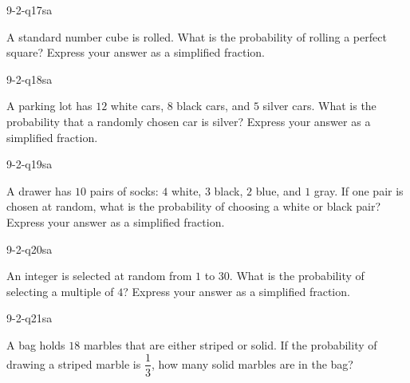 \begin{practiceQuestion}{9-2-q17}{sa}
\begin{questionText}
A standard number cube is rolled. What is the probability of rolling a perfect square? Express your answer as a simplified fraction.
\end{questionText}
\end{practiceQuestion}

\begin{practiceQuestion}{9-2-q18}{sa}
\begin{questionText}
A parking lot has $12$ white cars, $8$ black cars, and $5$ silver cars. What is the probability that a randomly chosen car is silver? Express your answer as a simplified fraction.
\end{questionText}
\end{practiceQuestion}

\begin{practiceQuestion}{9-2-q19}{sa}
\begin{questionText}
A drawer has $10$ pairs of socks: $4$ white, $3$ black, $2$ blue, and $1$ gray. If one pair is chosen at random, what is the probability of choosing a white or black pair? Express your answer as a simplified fraction.
\end{questionText}
\end{practiceQuestion}

\begin{practiceQuestion}{9-2-q20}{sa}
\begin{questionText}
An integer is selected at random from $1$ to $30$. What is the probability of selecting a multiple of $4$? Express your answer as a simplified fraction.
\end{questionText}
\end{practiceQuestion}

\begin{practiceQuestion}{9-2-q21}{sa}
\begin{questionText}
A bag holds $18$ marbles that are either striped or solid. If the probability of drawing a striped marble is $\dfrac{1}{3}$, how many solid marbles are in the bag?
\end{questionText}
\end{practiceQuestion}

